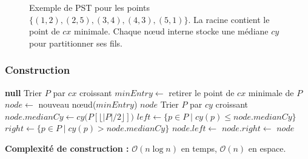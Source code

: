 \documentclass[11pt,a4paper]{article}
\begin{document}
\begin{figure}[h]
\centering
{}
\caption{Exemple de PST pour les points $\{(1,2),(2,5),(3,4),(4,3),(5,1)\}$. La racine contient le point de $cx$ minimale. Chaque nœud interne stocke une médiane $cy$ pour partitionner ses fils.}
\label{fig:pst}
\end{figure}

\subsubsection{Construction}

\begin{algorithm}[H]
\caption{Construction du Priority Search Tree}
\begin{algorithmic}[1]
     \Return \textbf{null} \EndIf
    \State Trier $P$ par $cx$ croissant
    \State $minEntry \gets$ retirer le point de $cx$ minimale de $P$
    \State $node \gets$ nouveau nœud($minEntry$)
     \Return $node$ \EndIf
    \State Trier $P$ par $cy$ croissant
    \State $node.medianCy \gets cy\bigl(P[\lfloor|P|/2\rfloor]\bigr)$
    \State $left  \gets \{ p \in P \mid cy(p) \leq node.medianCy \}$
    \State $right \gets \{ p \in P \mid cy(p) > node.medianCy \}$
    \State $node.left  \gets$ 
    \State $node.right \gets$ 
    \State \Return $node$
\EndProcedure
\end{algorithmic}
\end{algorithm}

\textbf{Complexité de construction :} $\mathcal{O}(n \log n)$ en temps, $\mathcal{O}(n)$ en espace.
\end{document}
